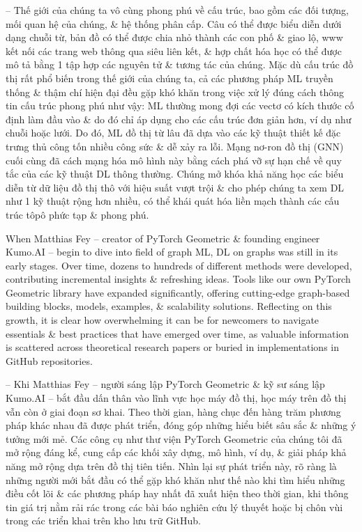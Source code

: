 \documentclass{article}
\begin{document}
\begin{itemize}
    -- Thế giới của chúng ta vô cùng phong phú về cấu trúc, bao gồm các đối tượng, mối quan hệ của chúng, \& hệ thống phân cấp. Câu có thể được biểu diễn dưới dạng chuỗi từ, bản đồ có thể được chia nhỏ thành các con phố \& giao lộ, www kết nối các trang web thông qua siêu liên kết, \& hợp chất hóa học có thể được mô tả bằng 1 tập hợp các nguyên tử \& tương tác của chúng. Mặc dù cấu trúc đồ thị rất phổ biến trong thế giới của chúng ta, cả các phương pháp ML truyền thống \& thậm chí hiện đại đều gặp khó khăn trong việc xử lý đúng cách thông tin cấu trúc phong phú như vậy: ML thường mong đợi các vectơ có kích thước cố định làm đầu vào \& do đó chỉ áp dụng cho các cấu trúc đơn giản hơn, ví dụ như chuỗi hoặc lưới. Do đó, ML đồ thị từ lâu đã dựa vào các kỹ thuật thiết kế đặc trưng thủ công tốn nhiều công sức \& dễ xảy ra lỗi. Mạng nơ-ron đồ thị (GNN) cuối cùng đã cách mạng hóa mô hình này bằng cách phá vỡ sự hạn chế về quy tắc của các kỹ thuật DL thông thường. Chúng mở khóa khả năng học các biểu diễn từ dữ liệu đồ thị thô với hiệu suất vượt trội \& cho phép chúng ta xem DL như 1 kỹ thuật rộng hơn nhiều, có thể khái quát hóa liền mạch thành các cấu trúc tôpô phức tạp \& phong phú.

    When {\sc Matthias Fey} -- creator of PyTorch Geometric \& founding engineer Kumo.AI -- begin to dive into field of graph ML, DL on graphs was still in its early stages. Over time, dozens to hundreds of different methods were developed, contributing incremental insights \& refreshing ideas. Tools like our own PyTorch Geometric library have expanded significantly, offering cutting-edge graph-based building blocks, models, examples, \& scalability solutions. Reflecting on this growth, it is clear how overwhelming it can be for newcomers to navigate essentials \& best practices that have emerged over time, as valuable information is scattered across theoretical research papers or buried in implementations in GitHub repositories.

    -- Khi {\sc Matthias Fey} -- người sáng lập PyTorch Geometric \& kỹ sư sáng lập Kumo.AI -- bắt đầu dấn thân vào lĩnh vực học máy đồ thị, học máy trên đồ thị vẫn còn ở giai đoạn sơ khai. Theo thời gian, hàng chục đến hàng trăm phương pháp khác nhau đã được phát triển, đóng góp những hiểu biết sâu sắc \& những ý tưởng mới mẻ. Các công cụ như thư viện PyTorch Geometric của chúng tôi đã mở rộng đáng kể, cung cấp các khối xây dựng, mô hình, ví dụ, \& giải pháp khả năng mở rộng dựa trên đồ thị tiên tiến. Nhìn lại sự phát triển này, rõ ràng là những người mới bắt đầu có thể gặp khó khăn như thế nào khi tìm hiểu những điều cốt lõi \& các phương pháp hay nhất đã xuất hiện theo thời gian, khi thông tin giá trị nằm rải rác trong các bài báo nghiên cứu lý thuyết hoặc bị chôn vùi trong các triển khai trên kho lưu trữ GitHub.


\end{itemize}
\end{document}
